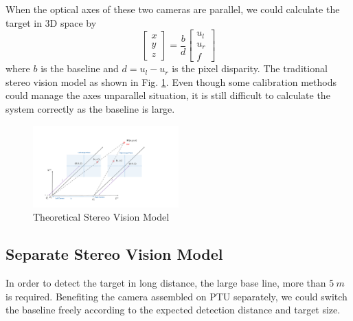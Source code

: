 When the optical axes of these two cameras are parallel, we could calculate the target in 3D space by
\begin{equation}
\left[ {\begin{array}{*{20}{c}}
	x \\ 
	y \\ 
	z 
	\end{array}} \right] =\frac{b}{d} \left[ {\begin{array}{*{20}{c}}
	u_l \\ 
	u_r \\ 
	f 
	\end{array}} \right]
\end{equation}
where $b$ is the baseline and $d=u_l-u_r$ is the pixel disparity. The traditional stereo vision model as shown in Fig. \ref{fig:chp03_vision_20_basic_stereo}. Even though some calibration methods could manage the axes unparallel situation, it is still difficult to calculate the system correctly as the baseline is large.

\begin{figure}[!tb]
	\centering
	\includegraphics[width=0.5\textwidth]{figs/chp03_vision_20_basic_stereo.pdf}	
	\caption{Theoretical Stereo Vision Model}
	\label{fig:chp03_vision_20_basic_stereo}
\end{figure}

\subsection{Separate Stereo Vision Model}
In order to detect the target in long distance, the large base line, more than $5\ m $ is required. Benefiting the camera assembled on PTU separately, we could switch the baseline freely according to the expected detection distance and target size.


